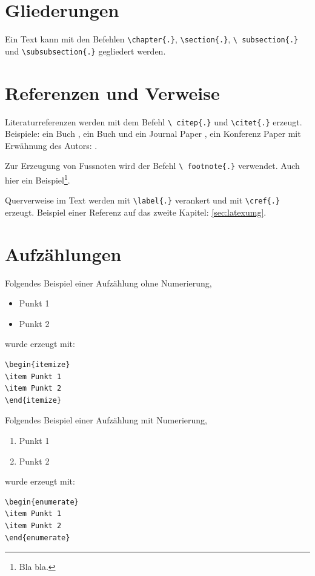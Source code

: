 \section{Gliederungen}
\label{sec:gliederung}

Ein Text kann mit den Befehlen \texttt{\textbackslash chapter\{.\}},
\texttt{\textbackslash section\{.\}}, \texttt{\textbackslash
  subsection\{.\}} und \texttt{\textbackslash subsubsection\{.\}}
gegliedert werden.


\section{Referenzen und Verweise}
\label{sec:refverw}

Literaturreferenzen werden mit dem Befehl \texttt{\textbackslash
  citep\{.\}} und \texttt{\textbackslash citet\{.\}}
erzeugt. Beispiele: ein Buch
\citep{Raibert1986LeggedRobotsThatBalance}, ein Buch und ein Journal
Paper
\citep{Raibert1986LeggedRobotsThatBalance,Vukobratovic2004ZeroMomentPoint},
ein Konferenz Paper mit Erwähnung des Autors: \citet{Pratt1995SEA}.

Zur Erzeugung von Fussnoten wird der Befehl \texttt{\textbackslash
  footnote\{.\}} verwendet. Auch hier ein Beispiel\footnote{Bla bla.}.

Querverweise im Text werden mit \texttt{\textbackslash label\{.\}}
verankert und mit \texttt{\textbackslash cref\{.\}} erzeugt.  Beispiel
einer Referenz auf das zweite Kapitel: \cref{sec:latexumg}.


\section{Aufzählungen}\label{sec:aufz}

Folgendes Beispiel einer Aufzählung ohne Numerierung,
\begin{itemize}
\item Punkt 1
\item Punkt 2
\end{itemize}
wurde erzeugt mit:
\begin{verbatim}
\begin{itemize}
\item Punkt 1
\item Punkt 2
\end{itemize}
\end{verbatim}

Folgendes Beispiel einer Aufzählung mit Numerierung,
\begin{enumerate}
\item Punkt 1
\item Punkt 2
\end{enumerate}
wurde erzeugt mit:
\begin{verbatim}
\begin{enumerate}
\item Punkt 1
\item Punkt 2
\end{enumerate}
\end{verbatim}

